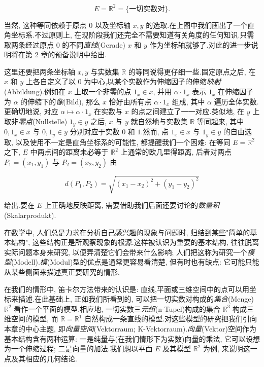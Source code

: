 \[
E = \mathbb{R}^2 = \{\text{一切实数对}\}.
\]

当然, 这种等同依赖于原点 $0$ 以及坐标轴 $x, y$ 的选取.在上图中我们画出了一个直角坐标系.不过原则上, 在现阶段我们还完全不需要知道有关角度的任何知识.只需取两条经过原点 $0$ 的不同\emph{直线}(\textup{Gerade}) $x$ 和 $y$ 作为坐标轴就够了.对此的进一步说明将在第 2 章的预备说明中给出.

这里还要把两条坐标轴 $x, y$ 与实数集 $\mathbb{R}$ 的等同说得更仔细一些.固定原点之后, 在 $x$ 和 $y$ 上各自定义了以 $0$ 为中心,以某个实数作为伸缩因子的伸缩\emph{映射}(\textup{Abbildung}).例如在 $x$ 上取一个非零的点 $1_x \in x$, 并用 $\alpha \cdot 1_x$ 表示 $1_x$ 在伸缩因子为 $\alpha$ 的伸缩下的\emph{像}(\textup{Bild}), 那么 $x$ 恰好由所有点 $\alpha \cdot 1_x$ 组成, 其中 $\alpha$ 遍历全体实数.更确切地说, 对应 $\alpha \longmapsto \alpha \cdot 1_x$ 在实数与 $x$ 的点之间建立了一一对应.类似地, 在 $y$ 上取非\emph{零点}(\textup{Nullstelle}) $1_y \in y$ 之后, $x$ 与 $y$ 就自然地与实数集 $\mathbb{R}$ 等同起来, 其中 $0, 1_x \in x$ 与 $0, 1_y \in y$ 分别对应于实数 $0$ 和 $1$.然而, 点 $1_x \in x$ 与 $1_y \in y$ 的自由选取, 以及使用不一定是直角坐标系的可能性, 都提醒我们一个困难: 在等同 $E = \mathbb{R}^2$ 之下, $E$ 中两点间的距离未必等于 $\mathbb{R}^2$ 上通常的欧几里得距离, 后者对两点 $P_1 = (x_1, y_1)$ 与 $P_2 = (x_2, y_2)$ 由

\[
d(P_1, P_2) = \sqrt{(x_1 - x_2)^2 + (y_1 - y_2)^2}
\]

给出.要在 $E$ 上正确地反映距离, 需要借助我们后面还要讨论的\emph{数量积}(\textup{Skalarprodukt}).

在数学中, 人们总是力求在分析自己感兴趣的现象与问题时, 归结到某些"简单的基本结构", 这些结构正是所观察现象的根源.这样被认识为重要的基本结构, 往往脱离实际问题本身来研究, 以便弄清楚它们会带来什么影响; 人们把这称为研究一个\emph{模型}(\textup{Modell}).\emph{模}(\textup{Modul})型的优点是通常更容易看清楚, 但有时也有缺点: 它可能只能从某些侧面来描述真正要研究的情形.

在我们的情形中, 笛卡尔方法带来的认识是: 直线,平面或三维空间中的点可以用坐标来描述.在此基础上, 正如我们所看到的, 可以把一切实数对构成的\emph{集合}(\textup{Menge}) $\mathbb{R}^2$ 看作一个平面的模型.相应地, 一切实数三\emph{元组}(\textup{n-Tupel})构成的集合 $\mathbb{R}^3$ 构成三维空间的模型, 而 $\mathbb{R} = \mathbb{R}^1$ 自然构成一条直线的模型.对这些模型的研究把我们引向本章的中心主题, 即\emph{向量空间}(\textup{Vektorraum; K-Vektorraum}).\emph{向量}(\textup{Vektor})空间作为基本结构含有两种运算: 一是纯量与(在我们情形下为实数)向量的乘法, 它可以设想为一个伸缩过程; 二是向量的加法.我们想以平面 $E$ 及其模型 $\mathbb{R}^2$ 为例, 来说明这一点及其相应的几何结论.

